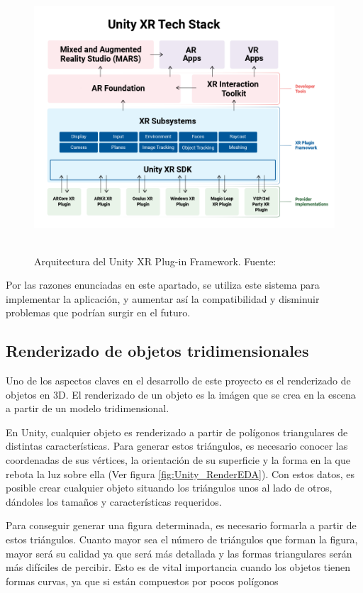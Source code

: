 \documentclass[../main.tex]{subfiles}
\begin{document}
\begin{figure}[h!]
\centering
\includegraphics[width=14cm, height=10cm]{imagenes/Unity_XR_plug-in_framework.png}
\caption{Arquitectura del Unity XR Plug-in Framework. Fuente:\cite{XR_Plug-in_Framework}}
\label{fig:XR_Architecture}
\end{figure}

Por las razones enunciadas en este apartado, se utiliza este sistema para implementar la aplicación, y aumentar así la compatibilidad y disminuir problemas que podrían surgir en el futuro.

\subsection{Renderizado de objetos tridimensionales} \label{Unity_Rendering}

Uno de los aspectos claves en el desarrollo de este proyecto es el renderizado de objetos en 3D. El renderizado de un objeto  es la imágen que se crea en la escena a partir de un modelo tridimensional.

En Unity, cualquier objeto es renderizado a partir de polígonos triangulares de distintas características. Para generar estos triángulos, es necesario conocer las coordenadas de sus vértices, la orientación de su superficie y la forma en la que rebota la luz sobre ella (Ver figura \ref{fig:Unity_RenderEDA}). Con estos datos, es posible crear cualquier objeto situando los triángulos unos al lado de otros, dándoles los tamaños y características requeridos.

Para conseguir generar una figura determinada, es necesario formarla a partir de estos triángulos. Cuanto mayor sea el número de triángulos que forman la figura, mayor será su calidad ya que será más detallada y las formas triangulares serán más difíciles de percibir. Esto es de vital importancia cuando los objetos tienen formas curvas, ya que si están compuestos por pocos polígonos
\end{document}
